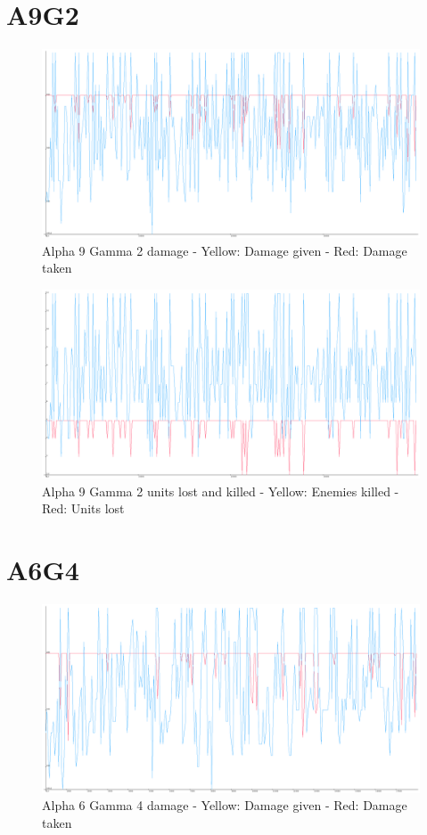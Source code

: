 \section{A9G2}
\begin{figure}[H]
\includegraphics[angle=-90, scale=0.30]{Figures/learningrate/A9G2/damage.png}
\caption{Alpha 9 Gamma 2 damage - Yellow: Damage given - Red: Damage taken}
\label{fig:app_a9g2_damage}
\end{figure}


\begin{figure}[H]
\includegraphics[angle=-90, scale=0.25]{Figures/learningrate/A9G2/units_lost_and_killed.png}
\caption{Alpha 9 Gamma 2 units lost and killed - Yellow: Enemies killed - Red: Units lost}
\label{fig:app_a9g2_lak}
\end{figure}
	
\section{A6G4}
\begin{figure}[H]
\includegraphics[angle=-90, scale=0.25]{Figures/learningrate/A6G4/damage.png}
\caption{Alpha 6 Gamma 4 damage - Yellow: Damage given - Red: Damage taken}
\label{fig:app_a6g4_damage}
\end{figure}	
			


